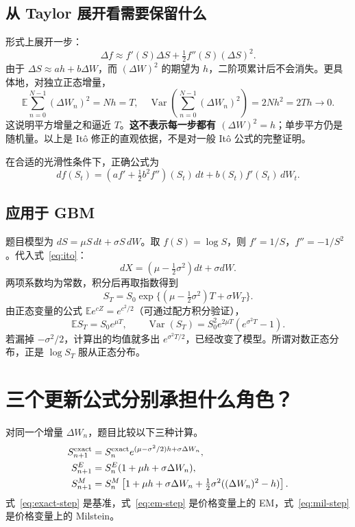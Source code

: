 \documentclass[11pt,a4paper,fontset=none]{ctexart}
\newcommand{\E}{\mathbb E}
\newcommand{\Var}{\operatorname{Var}}
\begin{document}
\subsection*{从 Taylor 展开看需要保留什么}
形式上展开一步：
\[
\Delta f\approx f'(S)\Delta S+\tfrac12 f''(S)(\Delta S)^2.
\]
由于 $\Delta S\approx ah+b\Delta W$，而 $(\Delta W)^2$ 的期望为 $h$，二阶项累计后不会消失。更具体地，对独立正态增量，
\[
\E\sum_{n=0}^{N-1}(\Delta W_n)^2=Nh=T,
\quad
\Var\!\left(\sum_{n=0}^{N-1}(\Delta W_n)^2\right)=2Nh^2=2Th\to0.
\]
这说明平方增量之和逼近 $T$。\textbf{这不表示每一步都有 $(\Delta W)^2=h$}；单步平方仍是随机量。以上是 It\^o 修正的直观依据，不是对一般 It\^o 公式的完整证明。

在合适的光滑性条件下，正确公式为
\begin{equation}\label{eq:ito}
df(S_t)=\left(a f'+\tfrac12b^2f''\right)(S_t)\,dt
        +b(S_t)f'(S_t)\,dW_t.
\end{equation}

\subsection*{应用于 GBM}
题目模型为 $dS=\mu S\,dt+\sigma S\,dW$。取 $f(S)=\log S$，则 $f'=1/S$，$f''=-1/S^2$。代入式~\eqref{eq:ito}：
\[
dX=(\mu-\tfrac12\sigma^2)dt+\sigma dW.
\]
两项系数均为常数，积分后再取指数得到
\begin{equation}\label{eq:gbm-exact}
S_T=S_0\exp\{(\mu-\tfrac12\sigma^2)T+\sigma W_T\}.
\end{equation}
由正态变量的公式 $\E e^{cZ}=e^{c^2/2}$（可通过配方积分验证），
\[
\E S_T=S_0e^{\mu T},\qquad
\Var(S_T)=S_0^2e^{2\mu T}(e^{\sigma^2T}-1).
\]
若漏掉 $-\sigma^2/2$，计算出的均值就多出 $e^{\sigma^2T/2}$，已经改变了模型。所谓对数正态分布，正是 $\log S_T$ 服从正态分布。

\newpage
\section{三个更新公式分别承担什么角色？}
对同一个增量 $\Delta W_n$，题目比较以下三种计算。
\begin{align}
S_{n+1}^{\rm exact}&=S_n^{\rm exact}
 e^{(\mu-\sigma^2/2)h+\sigma\Delta W_n},\label{eq:exact-step}\\
S_{n+1}^{E}&=S_n^E(1+\mu h+\sigma\Delta W_n),\label{eq:em-step}\\
S_{n+1}^{M}&=S_n^M\left[1+\mu h+\sigma\Delta W_n
 +\tfrac12\sigma^2((\Delta W_n)^2-h)\right].\label{eq:mil-step}
\end{align}
式~\eqref{eq:exact-step} 是基准，式~\eqref{eq:em-step} 是价格变量上的 EM，式~\eqref{eq:mil-step} 是价格变量上的 Milstein。
\end{document}
